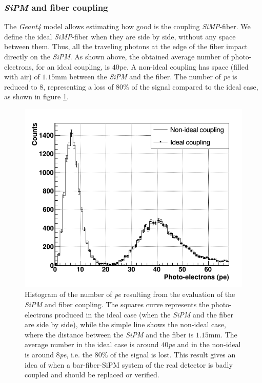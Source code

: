 \documentclass[submitting]{nst}
\begin{document}
\subsubsection{ \textsl{SiPM} and fiber coupling}%
The \textsl{Geant4} model allows estimating how good is the coupling \textsl{SiMP}-fiber. We define the ideal \textsl{SiMP}-fiber when they are side by side, without any space between them. Thus, all the traveling photons at the edge of the fiber impact directly on the \textsl{SiPM}. As shown above, the obtained average number of photo-electrons, for an ideal coupling, is $40$pe. A non-ideal coupling has space (filled with air) of $1.15$mm between the \textsl{SiPM} and the fiber. The number of \textsl{pe} is reduced to $8$, representing a loss of 80\% of the signal compared to the ideal case, as shown in figure \ref{coupling}.
%
%
\begin{figure}
    \centering
    \includegraphics[scale=0.41]{Figures/coupling.png}
    \caption{Histogram of the number of \textsl{pe} resulting from the evaluation of the \textsl{SiPM} and fiber coupling. The squares curve represents the photo-electrons produced in the ideal case (when the \textsl{SiPM} and the fiber are side by side), while the simple line shows the non-ideal case, where the distance between the \textsl{SiPM} and the fiber is $1.15$mm. The average number  in the ideal case is around $40$\textsl{pe} and in the non-ideal is around $8$\textsl{pe}, i.e. the $80$\% of the signal is lost. This result gives an idea of when a bar-fiber-SiPM system of the real detector is badly coupled and should be replaced or verified.}
    \label{coupling}
\end{figure}
\end{document}
